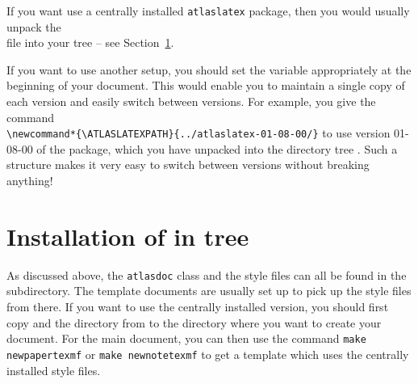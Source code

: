 If you want use a centrally installed \texttt{atlaslatex} package, then you would usually unpack the\\
 file into your  tree -- see Section~\ref{sec:texmf}.

If you want to use another setup, you should set the variable  appropriately
at the beginning of your document. This would enable you to maintain a single copy of each 
 version and easily switch between versions.
For example, you give the command\\
\verb|\newcommand*{\ATLASLATEXPATH}{../atlaslatex-01-08-00/}|
to use version 01-08-00 of the  package, which you have unpacked into the directory tree
.
Such a structure makes it very easy to switch between  versions without breaking anything!


\section{Installation of  in  tree}
\label{sec:texmf}

As discussed above, the \texttt{atlasdoc} class and the style files can all be found in the 
 subdirectory. The template documents are usually set up to pick up the style files from there.
If you want to use the centrally installed version,
you should first copy  and the  directory from 
 to the directory where you want to create your document.
For the main document, you can then use the command 
\texttt{make newpapertexmf} or \texttt{make newnotetexmf} to get a template which uses the
centrally installed style files.

